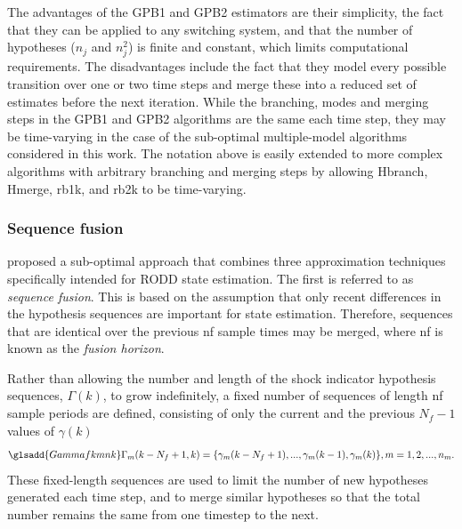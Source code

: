 The advantages of the \gls{GPB1} and \gls{GPB2} estimators are their simplicity, the fact that they can be applied to any switching system, and that the number of hypotheses ($n_j$ and $n_j^2$) is finite and constant, which limits computational requirements. The disadvantages include the fact that they model every possible transition over one or two time steps and merge these into a reduced set of estimates before the next iteration. While the branching, modes and merging steps in the \gls{GPB1} and \gls{GPB2} algorithms are the same each time step, they may be time-varying in the case of the sub-optimal multiple-model algorithms considered in this work. The notation above is easily extended to more complex algorithms with arbitrary branching and merging steps by allowing \gls{Hbranch}, \gls{Hmerge}, \gls{rb1k}, and \gls{rb2k} to be time-varying.

\subsubsection{Sequence fusion} \label{subsec-fusion}

\cite{robertson_detection_1995} proposed a sub-optimal approach that combines three approximation techniques specifically intended for \gls{RODD} state estimation. The first is referred to as \textit{sequence fusion}. This is based on the assumption that only recent differences in the hypothesis sequences are important for state estimation. Therefore, sequences that are identical over the previous \gls{nf} sample times may be merged, where \gls{nf} is known as the \textit{fusion horizon}.

Rather than allowing the number and length of the shock indicator hypothesis sequences, $\Gamma(k)$, to grow indefinitely, a fixed number of sequences of length \gls{nf} sample periods are defined, consisting of only the current and the previous $N_f-1$ values of $\gamma(k)$
\begin{equation} \label{eq:Gamma_kmf_k}
	\glsadd{Gammafkmnk}\Gamma_m(k-N_f+1,k)=\{\gamma_m(k-N_f+1), ...,  \gamma_m(k-1), \gamma_m(k)\}, m=1,2,...,n_m.
\end{equation}
These fixed-length sequences are used to limit the number of new hypotheses generated each time step, and to merge similar hypotheses so that the total number remains the same from one timestep to the next.

